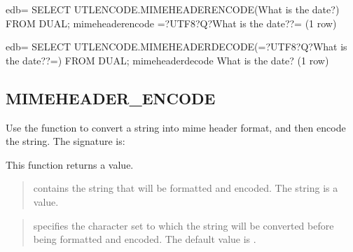 \documentclass[letterpaper,10pt,english,openany,oneside]{sphinxmanual}
\begin{document}
%
\begin{sphinxVerbatim}[commandchars=\\\{\}]
edb=\PYGZsh{} SELECT UTL\PYGZus{}ENCODE.MIMEHEADER\PYGZus{}ENCODE(\PYGZsq{}What is the date?\PYGZsq{}) FROM DUAL;
      mimeheader\PYGZus{}encode
\PYGZhy{}\PYGZhy{}\PYGZhy{}\PYGZhy{}\PYGZhy{}\PYGZhy{}\PYGZhy{}\PYGZhy{}\PYGZhy{}\PYGZhy{}\PYGZhy{}\PYGZhy{}\PYGZhy{}\PYGZhy{}\PYGZhy{}\PYGZhy{}\PYGZhy{}\PYGZhy{}\PYGZhy{}\PYGZhy{}\PYGZhy{}\PYGZhy{}\PYGZhy{}\PYGZhy{}\PYGZhy{}\PYGZhy{}\PYGZhy{}\PYGZhy{}\PYGZhy{}\PYGZhy{}
 =?UTF8?Q?What is the date??=
(1 row)

edb=\PYGZsh{} SELECT UTL\PYGZus{}ENCODE.MIMEHEADER\PYGZus{}DECODE(\PYGZsq{}=?UTF8?Q?What is the date??=\PYGZsq{}) FROM DUAL;
 mimeheader\PYGZus{}decode
\PYGZhy{}\PYGZhy{}\PYGZhy{}\PYGZhy{}\PYGZhy{}\PYGZhy{}\PYGZhy{}\PYGZhy{}\PYGZhy{}\PYGZhy{}\PYGZhy{}\PYGZhy{}\PYGZhy{}\PYGZhy{}\PYGZhy{}\PYGZhy{}\PYGZhy{}\PYGZhy{}\PYGZhy{}
 What is the date?
(1 row)
\end{sphinxVerbatim}

\newpage


\subsection{MIMEHEADER\_ENCODE}
\label{\detokenize{mimeheader_encode::doc}}\label{\detokenize{mimeheader_encode:mimeheader-encode}}
Use the  function to convert a string into mime header
format, and then encode the string. The signature is:
\begin{quote}

\end{quote}

This function returns a  value.


\begin{quote}

 contains the string that will be formatted and encoded. The
string is a  value.
\end{quote}

\begin{quote}

 specifies the character set to which the string
will be converted before being formatted and encoded. The default
value is .
\end{quote}
\end{document}
